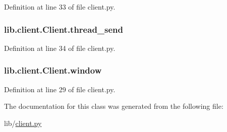 Definition at line 33 of file client.\+py.

\subsubsection[{\texorpdfstring{thread\+\_\+send}{thread_send}}]{\setlength{\rightskip}{0pt plus 5cm}lib.\+client.\+Client.\+thread\+\_\+send}\hypertarget{classlib_1_1client_1_1_client_ad877f8666b5123a6b388e32dfde1e35a}{}\label{classlib_1_1client_1_1_client_ad877f8666b5123a6b388e32dfde1e35a}


Definition at line 34 of file client.\+py.

\subsubsection[{\texorpdfstring{window}{window}}]{\setlength{\rightskip}{0pt plus 5cm}lib.\+client.\+Client.\+window}\hypertarget{classlib_1_1client_1_1_client_ab61a588e77b65d111685863ed9be01d9}{}\label{classlib_1_1client_1_1_client_ab61a588e77b65d111685863ed9be01d9}


Definition at line 29 of file client.\+py.



The documentation for this class was generated from the following file\+:\begin{DoxyCompactItemize}
\item 
lib/\hyperlink{client_8py}{client.\+py}\end{DoxyCompactItemize}
